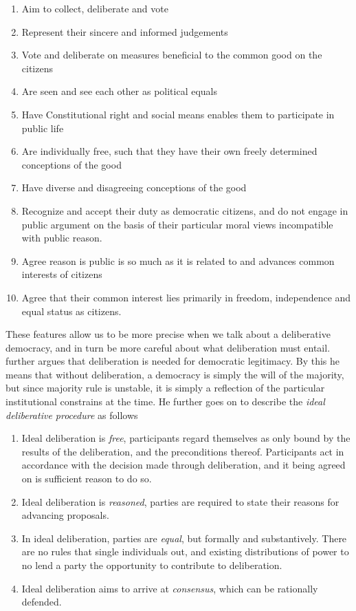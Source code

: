 \begin{enumerate}
	\label{list:deliberative-democracy}
	\setlength\itemsep{1px}
	\item  Aim to collect, deliberate and vote
	\item  Represent their sincere and informed judgements
	\item  Vote and deliberate on measures beneficial to the common good on the citizens
	\item  Are seen and see each other as political equals
	\item  Have Constitutional right and social means enables them to participate in public life
	\item  Are individually free, such that they have their own freely determined conceptions of the good
	\item  Have diverse and disagreeing conceptions of the good
	\item  Recognize and accept their duty as democratic citizens, and do not engage in public argument on the basis of their particular moral views incompatible with public reason.
	\item  Agree reason is public is so much as it is related to and advances common interests of citizens
	\item  Agree that their common interest lies primarily in freedom, independence and equal status as citizens.
\end{enumerate}

These features allow us to be more precise when we talk about a deliberative democracy, and in turn be more careful about what deliberation must entail. \citet{cohenDELIBERATIONDEMOCRATICLEGITIMACY2002} further argues that deliberation is needed for democratic legitimacy. By this he means that without deliberation, a democracy is simply the will of the majority, but since majority rule is unstable, it is simply a reflection of the particular institutional constrains at the time. He further goes on to describe the \textit{ideal deliberative procedure} as follows

\begin{enumerate}
	\label{list:ideal-deliberation}
	\setlength\itemsep{1px}
	\item  Ideal deliberation is \textit{free}, participants regard themselves as only bound by the results of the deliberation, and the preconditions thereof. Participants act in accordance with the decision made through deliberation, and it being agreed on is sufficient reason to do so.
	\item  Ideal deliberation is \textit{reasoned}, parties are required to state their reasons for advancing proposals.
	\item  In ideal deliberation, parties are \textit{equal}, but formally and substantively. There are no rules that single individuals out, and existing distributions of power to no lend a party the opportunity to contribute to deliberation.
	\item  Ideal deliberation aims to arrive at \textit{consensus}, which can be rationally defended.
\end{enumerate}

